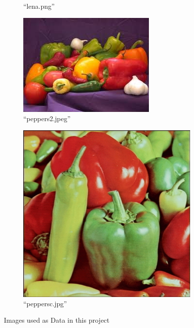 \documentclass[sigconf,authorversion]{acmart}
\begin{document}
\begin{figure}[hbtp]
\begin{subfigure}[b]{0.45\columnwidth}
      \caption{``lena.png''}
      \label{subfig:lena}
  \end{subfigure}
  \hspace{0.01\textwidth}
  \begin{subfigure}[b]{0.45\columnwidth}
    \includegraphics[width=\columnwidth]{../imgs/peppers2.jpeg}
    \caption{``peppers2.jpeg''}
    \label{subfig:peppers2}
  \end{subfigure}
  \hspace{0.01\textwidth}
  \begin{subfigure}[b]{0.45\columnwidth}
      \includegraphics[width=\columnwidth]{../imgs/peppersc.jpg}
      \caption{``peppersc.jpg''}
      \label{subfig:peppersc}
  \end{subfigure}
  \caption{Images used as Data in this project}
  \label{fig:original}
\end{figure}
\end{document}
